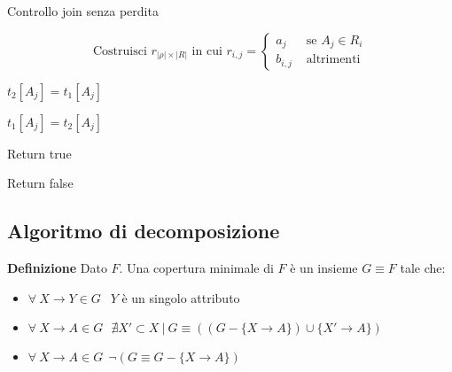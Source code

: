 \documentclass{article}
\begin{document}
\begin{algorithm}[H]
    \caption{Controllo join senza perdita}
    \begin{algorithmic}
        \State \[\text{Costruisci }r_{|\rho|\times|R|}\text{ in cui }r_{i,j}=\begin{cases}
            a_j  & \text{ se } A_j\in R_i\\
            b_{i,j} & \text{ altrimenti}
        \end{cases}\]

    \Repeat





                    \State $t_2[A_j]=t_1[A_j]$

                \Else

                    \State $t_1[A_j]=t_2[A_j]$

                \EndIf

            \EndFor

        \EndIf

    \EndFor
    


        \State Return true

    \EndIf

    \State Return false
        
    \end{algorithmic}
\end{algorithm}

\subsection{Algoritmo di decomposizione}

\textbf{Definizione} Dato $F$. Una copertura minimale di $F$ è un insieme $G\equiv F$ tale che:
\begin{itemize}
    \item $\forall\ X\rightarrow Y\in G\ \ $ $Y$ è un singolo attributo
    \item $\forall\ X\rightarrow A\in G\ \ \ \nexists X'\subset X\ |\ G\equiv ((G-\{X\rightarrow A\})\cup\{X'\rightarrow A\})$
    \item $\forall\ X\rightarrow A\in G\ \ \neg(G\equiv G-\{X\rightarrow A\})$\newline
\end{itemize}
\end{document}
